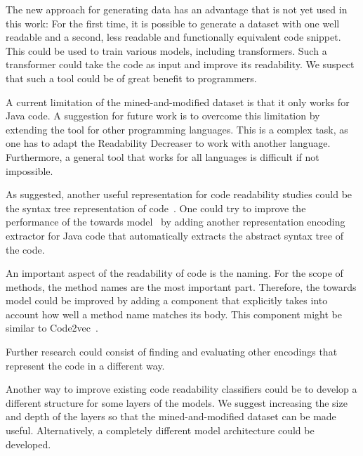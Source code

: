 \documentclass[%
class=scrreprt,
chapterprefix=false,%
open=right,%
twoside=false,%
paper=a4,%
logofile={Logo\_zentral\_farbig\_EN.png},%
thesistype=master,%
UKenglish,%
]{se2thesis}
\theoremstyle{definition}
\newcommand{\RDH}{Readability Decreaser\xspace}
\begin{document}
	The new approach for generating data has an advantage that is not yet used in this work: For the first time, it is possible to generate a dataset with one well readable and a second, less readable and functionally equivalent code snippet. This could be used to train various models, including transformers. Such a transformer could take the code as input and improve its readability. We suspect that such a tool could be of great benefit to programmers.
	
	A current limitation of the mined-and-modified dataset is that it only works for Java code. A suggestion for future work is to overcome this limitation by extending the tool for other programming languages. This is a complex task, as one has to adapt the \RDH to work with another language. Furthermore, a general tool that works for all languages is difficult if not impossible.
	
	
	As \citeauthor{mi2023graph} suggested, another useful representation for code readability studies could be the syntax tree representation of code~\cite{mi2023graph}. One could try to improve the performance of the towards model~\cite{mi2022towards} by adding another representation encoding extractor for Java code that automatically extracts the abstract syntax tree of the code.
	
	An important aspect of the readability of code is the naming. For the scope of methods, the method names are the most important part. Therefore, the towards model could be improved by adding a component that explicitly takes into account how well a method name matches its body. This component might be similar to Code2vec~\cite{alon2019code2vec}.
	
	Further research could consist of finding and evaluating other encodings that represent the code in a different way.
	
	Another way to improve existing code readability classifiers could be to develop a different structure for some layers of the models. We suggest increasing the size and depth of the layers so that the mined-and-modified dataset can be made useful. Alternatively, a completely different model architecture could be developed. 
	
\end{document}
